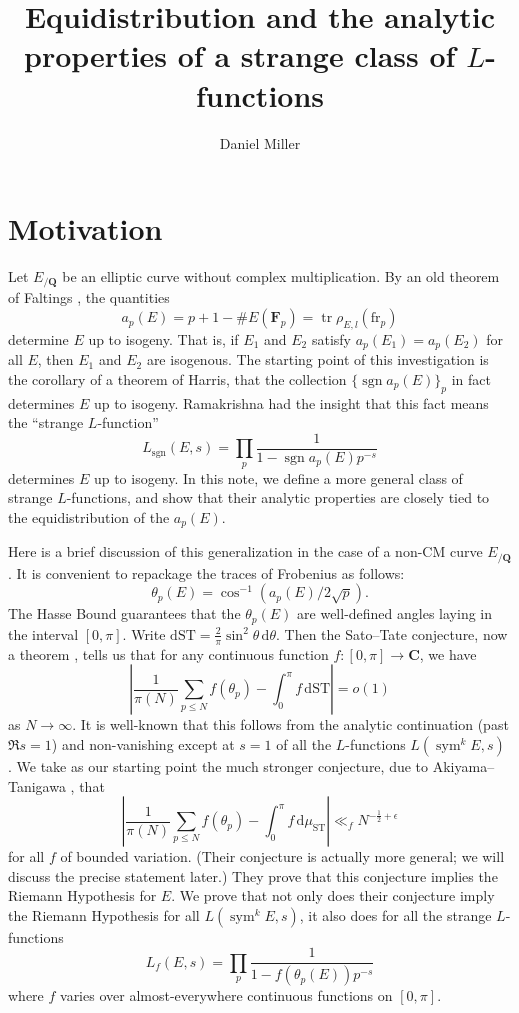 \documentclass{article}
\title{Equidistribution and the analytic properties of a strange class of 
$L$-functions}
\author{Daniel Miller}
\DeclareMathOperator{\sgn}{sgn}
\DeclareMathOperator{\sym}{sym}
\DeclareMathOperator{\tr}{tr}
\newcommand{\bC}{\mathbf{C}}
\newcommand{\bF}{\mathbf{F}}
\newcommand{\bQ}{\mathbf{Q}}
\newcommand{\dd}{\mathrm{d}}
\newcommand{\fr}{\mathrm{fr}}
\newcommand{\ST}{\mathrm{ST}}
\theoremstyle{definition}
\begin{document}
\maketitle





\section{Motivation}

Let $E_{/\bQ}$ be an elliptic curve without complex multiplication. By an old 
theorem of Faltings \cite{faltings-1983}, the quantities 
\[
	a_p(E) = p + 1 - \# E(\bF_p) = \tr \rho_{E,l} (\fr_p)
\]
determine $E$ up to isogeny. That is, if $E_1$ and $E_2$ satisfy 
$a_p(E_1)=a_p(E_2)$ for all $E$, then $E_1$ and $E_2$ are isogenous. The 
starting point of this investigation is the 
corollary of a theorem of Harris, that the collection $\{\sgn a_p(E)\}_p$ in 
fact determines $E$ up to isogeny. Ramakrishna had the insight that this fact 
means the ``strange $L$-function''
\[
	L_{\sgn}(E,s) = \prod_p \frac{1}{1-\sgn a_p(E) p^{-s}} 
\]
determines $E$ up to isogeny. In this note, we define a more general class of 
strange $L$-functions, and show that their analytic properties are closely 
tied to the equidistribution of the $a_p(E)$. 

Here is a brief discussion of this generalization in the case of a non-CM curve 
$E_{/\bQ}$. It is convenient to repackage the traces of Frobenius as follows:
\[
	\theta_p(E) = \cos^{-1}(a_p(E)/2\sqrt p) .
\]
The Hasse Bound guarantees that the $\theta_p(E)$ are well-defined angles 
laying in the interval $[0,\pi]$. Write 
$\dd\ST = \frac{2}{\pi} \sin^2\theta\, \dd\theta$. Then the Sato--Tate 
conjecture, now a theorem \cite{barnet-lamb-etal-2011}, tells us that for any 
continuous function $f\colon [0,\pi]\to \bC$, we have
\[
	\left| \frac{1}{\pi(N)} \sum_{p\leqslant N} f(\theta_p) - \int_0^\pi f\, \dd\ST\right| = o(1)
\]
as $N\to \infty$. It is well-known that this follows from the analytic 
continuation (past $\Re s=1$) and non-vanishing except at $s=1$ of all the 
$L$-functions $L(\sym^k E,s)$ \cite[A.1, Th.1]{serre-1968}. We take as our 
starting point the much stronger conjecture, due to Akiyama--Tanigawa 
\cite{akiyama-tanigawa}, that 
\[
	\left| \frac{1}{\pi(N)} \sum_{p\leqslant N} f(\theta_p) - \int_0^\pi f\, \dd \mu_\ST\right| \ll_f N^{-\frac 1 2+\epsilon}
\]
for all $f$ of bounded variation. (Their conjecture is actually more general; we will 
discuss the precise statement later.)
They prove that this conjecture implies the Riemann Hypothesis for $E$. We 
prove that not only does their conjecture imply the Riemann Hypothesis for all 
$L(\sym^k E,s)$, it also does for all the strange $L$-functions 
\[
	L_f(E,s) = \prod_p \frac{1}{1-f(\theta_p(E)) p^{-s}}
\]
where $f$ varies over almost-everywhere continuous functions on $[0,\pi]$. 
\end{document}
